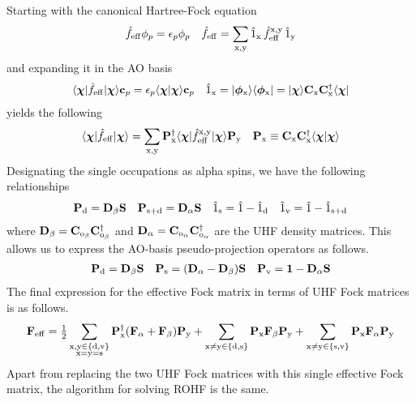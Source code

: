 \documentclass[11pt]{article}
\begin{document}
Starting with the canonical Hartree-Fock equation
\begin{align}
  \hat{f}_{\mathrm{eff}}
  \phi _p
=
  \epsilon _p
  \phi _p
&&
  \hat{f}_{\mathrm{eff}}
=
  \sum_{\mathrm{x},\mathrm{y}}
  \hat{1}_{\mathrm{x}}
  \,
  \hat{f}_{\mathrm{eff}}^{\mathrm{x},\mathrm{y}}
  \,
  \hat{1}_{\mathrm{y}}
\end{align}
and expanding it in the AO basis
\begin{align}
  \ip{\bm\x|\op{f}_\mr{eff}|\bm\x}
  \bo{c}_p
=
  \ev_p
  \ip{\bm\x|\bm\x}
  \bo{c}_p
&&
  \op{1}_\mr{x}
=
  \kt{\bm\f_\mr{x}}
  \br{\bm\f_\mr{x}}
=
  \kt{\bm\x}
  \bo{C}_\mr{x}
  \bo{C}_\mr{x}\dg
  \br{\bm\x}
\end{align}
yields the following
\begin{align}
  \ip{\bm\x|\op{f}_\mr{eff}|\bm\x}
=
  \sum_{\mr{x},\mr{y}}
  \bo{P}_\mr{x}\dg
  \ip{\bm\x|\op{f}_\mr{eff}^\mr{x,y}|\bm\x}
  \bo{P}_\mr{y}
&&
  \bo{P}_\mr{x}
\equiv
  \bo{C}_\mr{x}\bo{C}_\mr{x}\dg
  \ip{\bm\x|\bm\x}
\end{align}
Designating the single occupations as alpha spins, we have the following relationships
\begin{align}
  \mathbf{P}_{\mathrm{d}}
=
  \mathbf{D}_{\beta }\mathbf{S}
&&
  \mathbf{P}_{\mathrm{s+d}}
=
  \mathbf{D}_{\alpha }\mathbf{S}
&&
  \hat{1}_{\mathrm{s}}
=
  \hat{1}
-
  \hat{1}_{\mathrm{d}}
&&
  \hat{1}_{\mathrm{v}}
=
  \hat{1}
-
  \hat{1}_{\mathrm{s+d}}
\end{align}
where
$
  \mathbf{D}_{\beta }
=
  \mathbf{C}_{\mathrm{o}_{\beta }}
  \mathbf{C}_{\mathrm{o}_{\beta }}^\dagger
$
and
$
  \mathbf{D}_{\alpha }
=
  \mathbf{C}_{\mathrm{o}_{\alpha }}
  \mathbf{C}_{\mathrm{o}_{\alpha }}^\dagger
$
are the UHF density matrices.
This allows us to express the AO-basis pseudo-projection operators as follows.
\begin{align}
  \mathbf{P}_{\mathrm{d}}
=
  \mathbf{D}_{\beta }
  \mathbf{S}
&&
  \mathbf{P}_{\mathrm{s}}
=
  (\mathbf{D}_{\alpha } - \mathbf{D}_{\beta })
  \mathbf{S}
&&
  \mathbf{P}_{\mathrm{v}}
=
  \mathbf{1}
-
  \mathbf{D}_{\alpha }
  \mathbf{S}
\end{align}
The final expression for the effective Fock matrix in terms of UHF Fock matrices is as follows.
\begin{align}
  \mathbf{F}_{\mathrm{eff}}
=
  \tfrac{1}{2}
  \sum_{
    \substack{
      \mathrm{x},\mathrm{y}\in\{\mathrm{d},\mathrm{v}\} \\
      \mathrm{x} = \mathrm{y} = \mathrm{s}
    }
  }
  \mathbf{P}_{\mathrm{x}}^\dagger
  (\mathbf{F}_{\alpha } + \mathbf{F}_{\beta })
  \mathbf{P}_{\mathrm{y}}
+
  \sum_{\mathrm{x}\neq\mathrm{y}\in\{\mathrm{d},\mathrm{s}\}}
  \mathbf{P}_{\mathrm{x}}
  \mathbf{F}_{\beta }
  \mathbf{P}_{\mathrm{y}}
+
  \sum_{\mathrm{x}\neq\mathrm{y}\in\{\mathrm{s},\mathrm{v}\}}
  \mathbf{P}_{\mathrm{x}}
  \mathbf{F}_{\alpha }
  \mathbf{P}_{\mathrm{y}}
\end{align}
Apart from replacing the two UHF Fock matrices with this single effective Fock matrix, the algorithm for solving ROHF is the same.
\end{document}

